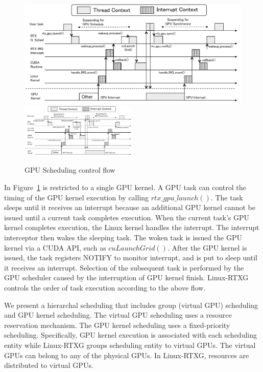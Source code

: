\begin{figure}[!t]
\begin{center}
\ifthesis
\includegraphics[width=\textwidth]{img/gsched_controlflow.pdf}
\else
\includegraphics[width=0.5\textwidth]{img/gsched_controlflow.pdf}
\fi
\caption{GPU Scheduling control flow}
\label{fig:controlflow}
\end{center}
\end{figure}

In Figure~\ref{fig:controlflow} is restricted to a single GPU kernel.
A GPU task can control the timing of the GPU kernel execution by calling $rtx\_gpu\_launch()$.
The task sleeps until it receives an interrupt because an additional GPU kernel cannot be issued until a current task completes execution.
When the current task's GPU kernel completes execution, the Linux kernel handles the interrupt.
The interrupt interceptor then wakes the sleeping task.
The woken task is issued the GPU kernel via a CUDA API, such as $cuLaunchGrid()$.
After the GPU kernel is issued, the task registers NOTIFY to monitor interrupt,
and is put to sleep until it receives an interrupt.
Selection of the subsequent task is performed by the GPU scheduler caused by the interruption of GPU kernel finish.
Linux-RTXG controls the order of task execution according to the above flow.

We present a hierarchal scheduling that includes group (virtual GPU) scheduling and GPU kernel scheduling.
The virtual GPU scheduling uses a resource reservation mechanism.
The GPU kernel scheduling uses a fixed-priority scheduling.
Specifically, GPU kernel execution is associated with each scheduling entity while Linux-RTXG groups scheduling entity to virtual GPUs.
The virtual GPUs can belong to any of the physical GPUs.
In Linux-RTXG, resources are distributed to virtual GPUs.

